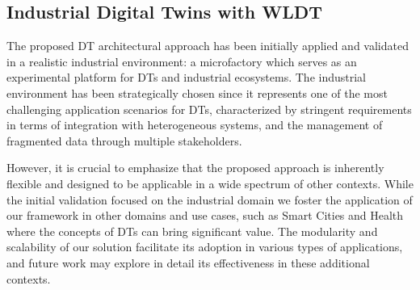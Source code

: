 


\subsection{Industrial Digital Twins with WLDT}
\label{sec:industrial-dt-wldt}

The proposed DT architectural approach has been initially applied and validated in a realistic industrial environment: a microfactory which serves as an experimental platform for DTs and industrial ecosystems. The industrial environment has been strategically chosen since it represents one of the most challenging application scenarios for DTs, characterized by stringent requirements in terms of integration with heterogeneous systems, and the management of fragmented data through multiple stakeholders. 

However, it is crucial to emphasize that the proposed approach is inherently flexible and designed to be applicable in a wide spectrum of other  contexts. While the initial validation focused on the industrial domain we foster the application of our framework in other domains and use cases, such as Smart Cities \cite{10.1145/3570361.3614070} and Health \cite{9325551} where the concepts of DTs can bring significant value. The modularity and scalability of our solution facilitate its adoption in various types of applications, and future work may explore in detail its effectiveness in these additional contexts.

